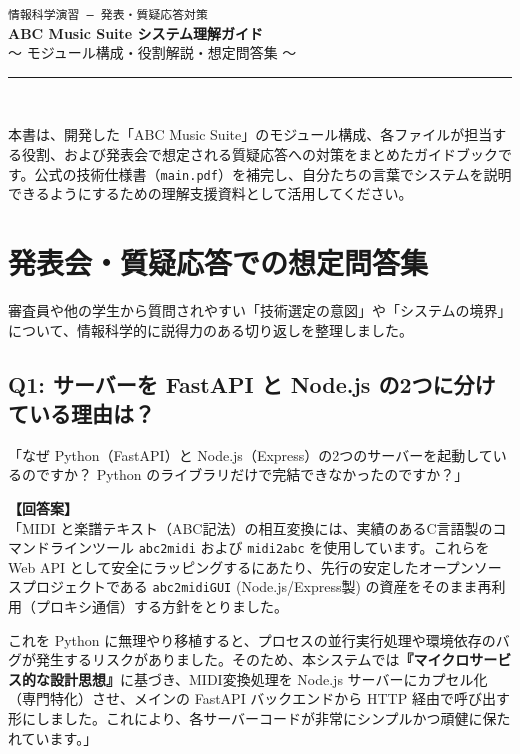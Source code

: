 \documentclass[a4paper,11pt]{jlreq}
\newcommand{\file}[1]{\texttt{\color{brand-green}#1}}
\begin{document}
\begin{center}
  {\fontsize{14}{18}\selectfont\color{brand-cyan}\texttt{情報科学演習 --- 発表・質疑応答対策}}\\[0.8em]
  {\fontsize{24}{30}\selectfont\bfseries\color{brand-purple}ABC Music Suite システム理解ガイド}\\[0.4em]
  {\fontsize{14}{18}\selectfont\color{text-muted}〜 モジュール構成・役割解説・想定問答集 〜}\\[1.5em]
  {\color{brand-purple!50}\rule{\textwidth}{1.5pt}}\\[1em]
\end{center}

本書は、開発した「ABC Music Suite」のモジュール構成、各ファイルが担当する役割、および発表会で想定される質疑応答への対策をまとめたガイドブックです。公式の技術仕様書（\file{main.pdf}）を補完し、自分たちの言葉でシステムを説明できるようにするための理解支援資料として活用してください。

\tableofcontents
\newpage

\section{発表会・質疑応答での想定問答集}

審査員や他の学生から質問されやすい「技術選定の意図」や「システムの境界」について、情報科学的に説得力のある切り返しを整理しました。

\subsection{Q1: サーバーを FastAPI と Node.js の2つに分けている理由は？}

\begin{tcolorbox}[qbox, title=質問の要旨]
「なぜ Python（FastAPI）と Node.js（Express）の2つのサーバーを起動しているのですか？ Python のライブラリだけで完結できなかったのですか？」
\end{tcolorbox}

\begin{tcolorbox}[abox]
\textbf{【回答案】} \\
「MIDI と楽譜テキスト（ABC記法）の相互変換には、実績のあるC言語製のコマンドラインツール \file{abc2midi} および \file{midi2abc} を使用しています。これらを Web API として安全にラッピングするにあたり、先行の安定したオープンソースプロジェクトである \file{abc2midiGUI} (Node.js/Express製) の資産をそのまま再利用（プロキシ通信）する方針をとりました。

これを Python に無理やり移植すると、プロセスの並行実行処理や環境依存のバグが発生するリスクがありました。そのため、本システムでは\textbf{『マイクロサービス的な設計思想』}に基づき、MIDI変換処理を Node.js サーバーにカプセル化（専門特化）させ、メインの FastAPI バックエンドから HTTP 経由で呼び出す形にしました。これにより、各サーバーコードが非常にシンプルかつ頑健に保たれています。」
\end{tcolorbox}
\end{document}

